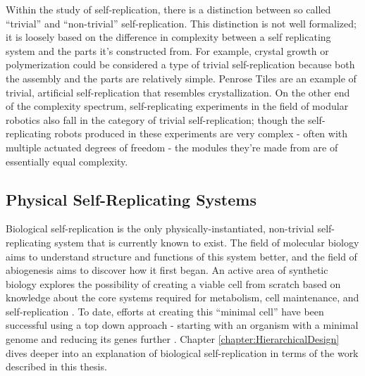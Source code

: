 {Within the study of self-replication, there is a distinction between so called ``trivial'' and ``non-trivial'' self-replication.  This distinction is not well formalized; it is loosely based on the difference in complexity between a self replicating system and the parts it's constructed from.  For example, crystal growth or polymerization could be considered a type of trivial self-replication because both the assembly and the parts are relatively simple.  Penrose Tiles \cite{Penrose1958} are an example of trivial, artificial self-replication that resembles crystallization.  On the other end of the complexity spectrum, self-replicating experiments in the field of modular robotics also fall in the category of trivial self-replication; though the self-replicating robots produced in these experiments are very complex  \cite{Zykov2005} - often with multiple actuated degrees of freedom - the modules they're made from are of essentially equal complexity.

\subsection{Physical Self-Replicating Systems}

Biological self-replication is the only physically-instantiated, non-trivial self-replicating system that is currently known to exist.  The field of molecular biology aims to understand structure and functions of this system better, and the field of abiogenesis aims to discover how it first began.  An active area of synthetic biology explores the possibility of creating a viable cell from scratch based on knowledge about the core systems required for metabolism, cell maintenance, and self-replication \cite{Forster2006}.  To date, efforts at creating this ``minimal cell'' have been successful using a top down approach - starting with an organism with a minimal genome and reducing its genes further \cite{Glass2006} \cite{Gibson2010} \cite{Iii2016}.  Chapter \ref{chapter:HierarchicalDesign} dives deeper into an explanation of biological self-replication in terms of the work described in this thesis. 

}
